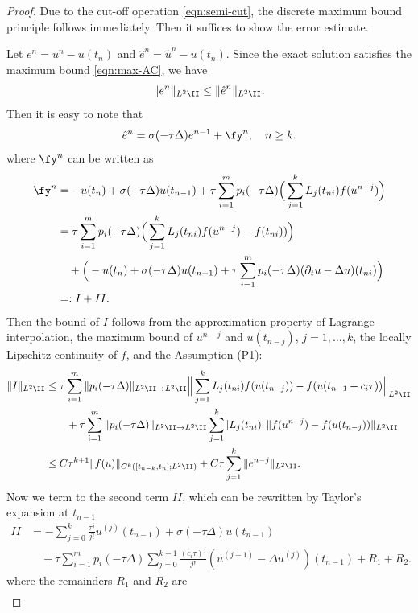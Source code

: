 \begin{proof}
Due to the cut-off operation \eqref{eqn:semi-cut}, the discrete
maximum bound principle follows immediately.
Then it suffices to show the error estimate.

Let $e ^n=u^n-u(t_n)$ and $\hat e ^n=\hat u^n-u(t_n)$. Since the exact solution satisfies the maximum bound \eqref{eqn:max-AC}, we have
$$  \|  e ^n  \|_{L^2\II} \le  \|  \hat e ^n  \|_{L^2\II}. $$
Then it is easy to note that
$$  \hat e^{n} = \sigma (-\tau\Delta) e ^{n-1} + \fy^n,\quad n \ge k. $$
where $\fy^n$ can be written as
\begin{align*}
  \fy^n &= -u(t_{n}) + \sigma(-\tau\Delta) u(t_{n-1}) + \tau \sum_{i=1}^m p_i(-\tau \Delta)
  \Big(\sum_{j=1}^{k} L_j (t_{ni}) f(u^{n-j})\Big) \\
  &= \tau \sum_{i=1}^m p_i(-\tau \Delta)\Big(  \sum_{j=1}^{k} L_j (t_{ni}) f(u^{n-j}) - f(t_{ni}))\Big)\\
  &\quad + \Big(-u(t_{n}) + \sigma(-\tau\Delta) u(t_{n-1}) + \tau \sum_{i=1}^m p_i(-\tau \Delta) (\partial_t u - \Delta u) (t_{ni})\Big)\\
  &=: I + II.
\end{align*}
Then the bound of $I$ follows  from the approximation property of Lagrange interpolation, the maximum bound of $u^{n-j}$ and $u(t_{n-j})$, $j=1,\ldots,k$,
the locally Lipschitz continuity of $f$, and the Assumption (P1):
\begin{align*}
   \|  I  \|_{L^2\II} &\le  \tau \sum_{i=1}^m \| p_i(-\tau \Delta)\|_{L^2\II\rightarrow L^2\II} \Big\|\sum_{j=1}^k L_j(t_{ni}) f(u(t_{n-j}))- f(u(t_{n-1} + c_i\tau))\Big\|_{L^2\II}\\
   &\qquad + \tau \sum_{i=1}^m \| p_i(-\tau \Delta)\|_{L^2\II\rightarrow L^2\II} \sum_{j=1}^k |L_j(t_{ni})|\,\| f(u^{n-j})- f(u(t_{n-j} ))\|_{L^2\II}\\
   &\le C\tau^{k+1} \|  f(u) \|_{C^{k}([t_{n-k},t_n];L^2\II)} + C \tau \sum_{j=1}^k \|  e^{n-j}  \|_{L^2\II}.
\end{align*}
Now we term to the second term $II$, which can be rewritten by Taylor's expansion at $t_{n-1}$
\begin{align*}
 II &= -\sum_{j=0}^k\frac{\tau^j}{j!} u^{(j)} (t_{n-1}) + \sigma(-\tau \Delta)u(t_{n-1})\\
  &\quad + \tau \sum_{i=1}^m p_i(-\tau \Delta) \sum_{j=0}^{k-1}
  \frac{(c_i\tau)^j}{j!}
  (u^{(j+1)} - \Delta u^{(j)})
  (t_{n-1}) + R_1 + R_2.
\end{align*}
where the remainders $R_1$ and $R_2$ are
\begin{align*}

\end{align*}
\end{proof}
